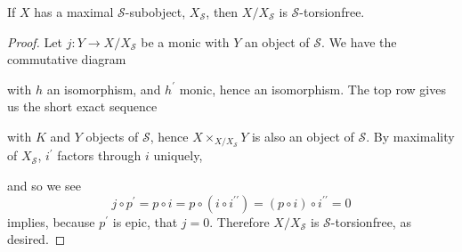 \documentclass[dissertation.tex]{subfiles}
\begin{document}
\begin{lem}\label{lem2}
  If $X$ has a maximal $\mathcal{S}$-subobject, $X_\mathcal{S}$, then $X/X_\mathcal{S}$ is $\mathcal{S}$-torsionfree.
  \begin{proof}
    Let $j \colon Y \rightarrow X/X_\mathcal{S}$ be a monic with $Y$ an object of $\mathcal{S}$.
    We have the commutative diagram
    \begin{center}
    \end{center}
    with $h$ an isomorphism, and $h^\prime$ monic, hence an isomorphism.
    The top row gives us the short exact sequence
    \begin{center}
    \end{center}
    with $K$ and $Y$ objects of $\mathcal{S}$, hence $X \times_{X/X_\mathcal{S}} Y$ is also an object of $\mathcal{S}$.
    By maximality of $X_\mathcal{S}$,  $i^\prime$ factors through $i$ uniquely,
    \begin{center}
    \end{center}
    and so we see
    $$j \circ p^\prime = p \circ i = p \circ (i \circ i^{\prime\prime}) = (p \circ i) \circ i^{\prime\prime} = 0$$
    implies, because $p^\prime$ is epic, that $j = 0$.
    Therefore $X/X_\mathcal{S}$ is $\mathcal{S}$-torsionfree, as desired.
  \end{proof}
\end{lem}
\end{document}
